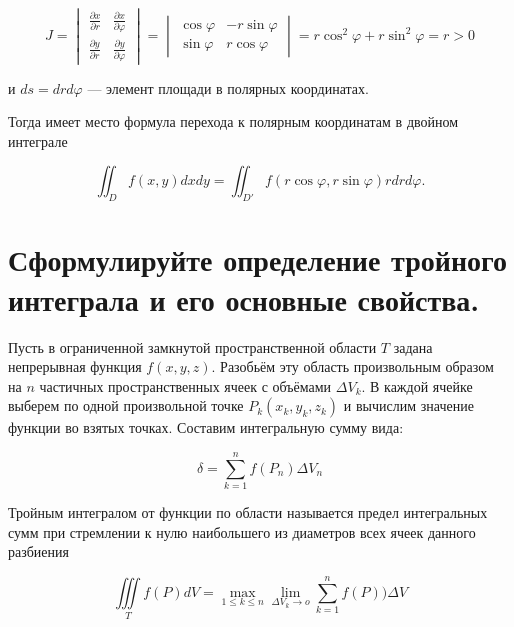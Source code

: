 \documentclass{article}
\begin{document}
\[
  J =
  \begin{vmatrix}
    \frac{\partial x}{\partial r} & \frac{\partial x}{\partial \varphi} \\
    \frac{\partial y}{\partial r} & \frac{\partial y}{\partial \varphi}
  \end{vmatrix}
  =
  \begin{vmatrix}
    \cos\varphi & -r\sin\varphi \\
    \sin\varphi & r\cos\varphi
  \end{vmatrix}
  = r\cos^2\varphi + r\sin^2\varphi = r > 0
\]

и \( ds = drd\varphi \) --- элемент площади в полярных координатах.

Тогда имеет место формула перехода к полярным координатам в двойном интеграле

\[
  \iint_D f(x, y) dxdy = \iint_{D'} f(r\cos\varphi, r\sin\varphi) r dr d\varphi.
\]
\section{Сформулируйте определение тройного интеграла и его основные свойства.}
Пусть в ограниченной замкнутой пространственной области $T$ задана непрерывная функция $f(x, y, z)$.
Разобьём эту область произвольным образом на $n$ частичных пространственных ячеек с объёмами $\Delta V_k$.
В каждой ячейке выберем по одной произвольной точке $P_k(x_k, y_k, z_k)$ и вычислим значение функции
во взятых точках. Составим интегральную сумму вида:

\begin{equation}
  \delta = \sum_{k=1}^{n} f(P_n) \Delta{V_n}
\end{equation}

Тройным интегралом от функции по области называется предел интегральных сумм при стремлении к нулю наибольшего из диаметров всех ячеек данного разбиения

\begin{equation}
\iiint\limits_T f(P) dV =  \max\limits_\text{$1 \leq k \leq n$} \lim_{\Delta V_k \to o} \sum_{k=1}^{n} f(P)) \Delta{V}
\end{equation}
\end{document}
